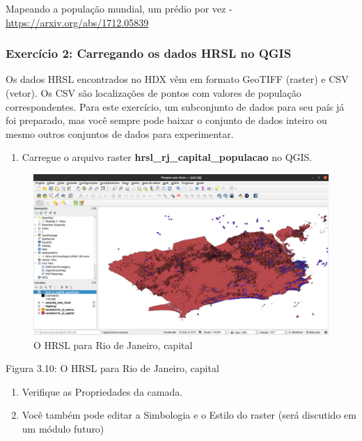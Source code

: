\documentclass[
  portuguese,
]{krantz}
\providecommand{\tightlist}{%
  \setlength{\itemsep}{0pt}\setlength{\parskip}{0pt}}
\begin{document}
Mapeando a população mundial, um prédio por vez - \url{https://arxiv.org/abs/1712.05839}

\hypertarget{exercuxedcio-2-carregando-os-dados-hrsl-no-qgis}{%
\subsubsection{\texorpdfstring{\textbf{Exercício 2: Carregando os dados HRSL no QGIS}}{Exercício 2: Carregando os dados HRSL no QGIS}}\label{exercuxedcio-2-carregando-os-dados-hrsl-no-qgis}}

Os dados HRSL encontrados no HDX vêm em formato GeoTIFF (raster) e CSV (vetor). Os CSV são localizações de pontos com valores de população correspondentes. Para este exercício, um subconjunto de dados para seu país já foi preparado, mas você sempre pode baixar o conjunto de dados inteiro ou mesmo outros conjuntos de dados para experimentar.

\begin{enumerate}
\def\labelenumi{\arabic{enumi}.}
\tightlist
\item
  Carregue o arquivo raster \textbf{hrsl\_rj\_capital\_populacao} no QGIS.
\end{enumerate}

\begin{figure}
\centering
\includegraphics{media/modulo3/hrsl-1.png}
\caption{O HRSL para Rio de Janeiro, capital}
\end{figure}

Figura 3.10: O HRSL para Rio de Janeiro, capital

\begin{enumerate}
\def\labelenumi{\arabic{enumi}.}
\setcounter{enumi}{1}
\tightlist
\item
  Verifique as Propriedades da camada.
\item
  Você também pode editar a Simbologia e o Estilo do raster (será discutido em um módulo futuro)
\end{enumerate}
\end{document}
